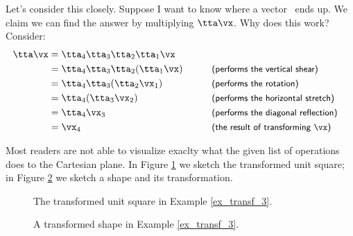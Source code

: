 {Let's consider this closely. Suppose I want to know where a vector \vx\ ends up. We claim we can find the answer by multiplying $\tta\vx$. Why does this work? Consider:
\begin{align*}
\tta\vx &= \tta_4\tta_3\tta_2\tta_1\vx \\
				&= \tta_4\tta_3\tta_2(\tta_1\vx) & &\textsf{\hskip 20pt  \small(performs the vertical shear)}\hfill \\
				&= \tta_4\tta_3(\tta_2\vx_1) & &\textsf{\hskip 20pt  \small(performs the rotation)}\hfill\\
				&= \tta_4(\tta_3\vx_2) & &\textsf{\hskip 20pt  \small(performs the horizontal stretch)}\hfill\\
				&= \tta_4\vx_3 & &\textsf{\hskip 20pt  \small(performs the diagonal reflection)}\hfill\\
				&= \vx_4 & &\textsf{\hskip 20pt  \small(the result of transforming $\vx$)}\hfill \\
\end{align*}

Most readers are not able to visualize exaclty what the given list of operations does to the Cartesian plane. In Figure \ref{fig:trans_3_1} we sketch the transformed unit square; in Figure \ref{fig:trans_3_2} we sketch a shape and its transformation.

\begin{figure}[h!]
\begin{center}
\end{center}
\caption{The transformed unit square in Example \ref{ex_transf_3}.}
\label{fig:trans_3_1}
\end{figure}

\begin{figure}[h!]
\begin{center}
\end{center}
\caption{A transformed shape in Example \ref{ex_transf_3}.}
\label{fig:trans_3_2}
\end{figure}
}

